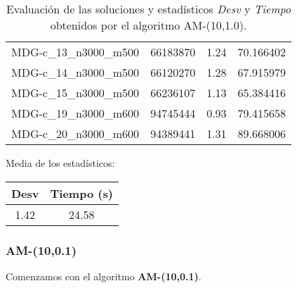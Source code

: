 \documentclass{article}
\begin{document}
\begin{table}[H]
\begin{tabular}{|cccc|}
		MDG-c\_13\_n3000\_m500 & 66183870 & 1.24 & 70.166402\\
		MDG-c\_14\_n3000\_m500 & 66120270 & 1.28 & 67.915979\\
		MDG-c\_15\_n3000\_m500 & 66236107 & 1.13 & 65.384416\\
		MDG-c\_19\_n3000\_m600 & 94745444 & 0.93 & 79.415658\\
		MDG-c\_20\_n3000\_m600 & 94389441 & 1.31 & 89.668006\\
		\hline
	\end{tabular}
	\caption{Evaluación de las soluciones y estadísticos \emph{Desv} y \emph{Tiempo} obtenidos por el algoritmo AM-(10,1.0).}
	\label{tab:am-10-1}
\end{table}

Media de los estadísticos:
\begin{table}[H]
	\centering
	\begin{tabular}{|cc|}
		\hline
		Desv & Tiempo (s)\\ \hline
		1.42 & 24.58 \\
		\hline
	\end{tabular}
\end{table}

\pagebreak

\subsubsection*{AM-(10,0.1)}

Comenzamos con el algoritmo \textbf{AM-(10,0.1)}.
\end{document}
